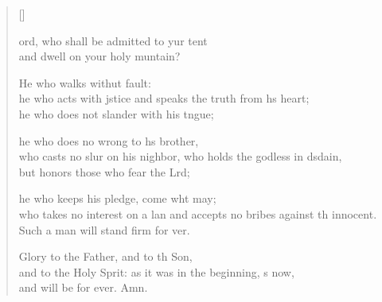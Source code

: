 \settowidth{\versewidth}{and accepts no bribes against the innocent.   *}
\begin{verse}[\versewidth]
  \begin{patverse}
ord, who shall be admitted to yur tent\Med\\
and dwell on your holy muntain?

He who walks withut fault:\Med\\
he who acts with jstice
and speaks the truth from h\pointup{\i}s heart;\Med\\
he who does not slander with his tngue;

he who does no wrong to h\pointup{\i}s brother,\Med\\
who casts no slur on his nighbor,
who holds the godless in d\pointup{\i}sdain,\Med\\
but honors those who fear the Lrd;

he who keeps his pledge, come wht may;\Med\\
who takes no interest on a lan
and accepts no bribes against th innocent.\Med\\
Such a man will stand firm for ver.

Glory to the Father, and to th Son,\Med\\
and to the Holy Sp\pointup{\i}rit:
as it was in the beginning, \pointup{\i}s now,\Med\\
and will be for ever. Amn.
  \end{patverse}
\end{verse}
